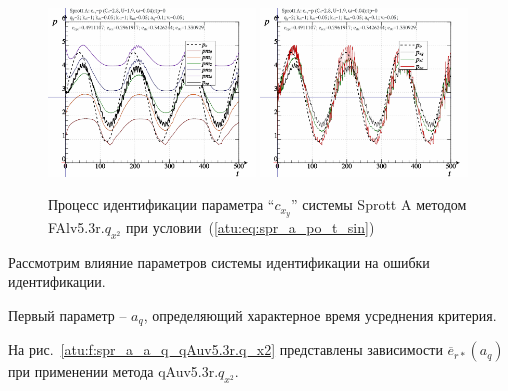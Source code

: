\begin{figure}[h!]
  \centerline{
    \includegraphics[width=0.49\textwidth]{p/cha/spr_a/FAlv5.3A/sprott_a_FAlv5x3r-pl_n_sin.png}
    \hfill
    \includegraphics[width=0.49\textwidth]{p/cha/spr_a/FAlv5.3A/sprott_a_FAlv5x3r-p_p_sin.png}
  }
  \caption{Процесс идентификации параметра ``$c_{x_y}$'' системы Sprott A методом FAlv5.3r.$q_{x^2}$ при условии~(\ref{atu:eq:spr_a_po_t_sin})}
  \label{atu:f:spr_a_id_FAlv5.3r.q_x2_sin}
\end{figure}




Рассмотрим влияние параметров системы идентификации на
ошибки идентификации.

Первый параметр --
$a_q$, определяющий характерное время усреднения критерия.

На рис.~\ref{atu:f:spr_a_a_q_qAuv5.3r.q_x2} представлены зависимости
$\overline{e}_{r*}(a_q)$ при применении метода qAuv5.3r.$q_{x^2}$.

